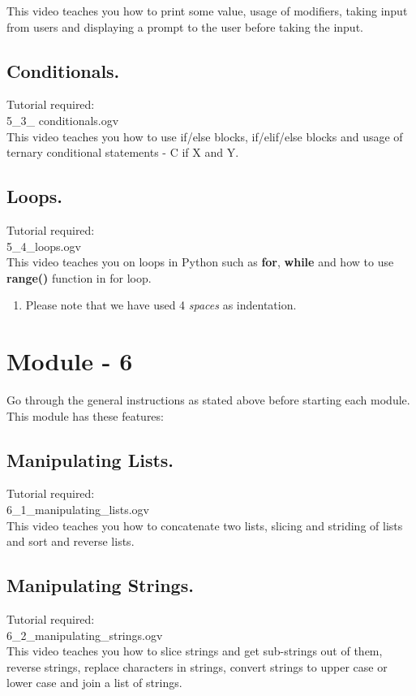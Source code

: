 \documentclass[11pt,twocolumn]{article}
\newenvironment{enumcpt}{\begin{enumerate} \topsep 0pt \partopsep 0pt 
                        \parsep 0pt
                        \itemsep 0pt \leftmargin -1in \rightmargin 0pt
                        }{\end{enumerate}}
\begin{document}
This video teaches you how to print some value, usage of modifiers, taking input from users and displaying a prompt to the user before taking the input. 
\subsection{Conditionals.}
Tutorial required: \\ 5\_3\_ conditionals.ogv \\
This video teaches you how to use if/else blocks, if/elif/else blocks and usage of ternary conditional statements - C if X and Y.
\subsection{Loops.}
Tutorial required: \\ 5\_4\_loops.ogv \\

This video teaches you on loops in Python such as \textbf{for}, \textbf{while} and how to use \textbf{range()} function in for loop. \\ 
\begin{enumcpt}
\item Please note that we have used 4 \emph{spaces} as indentation.
\end{enumcpt} 

\section{Module - 6}
Go through the general instructions as stated above before starting each module.
This module has these features:
\subsection{Manipulating Lists.}
Tutorial required: \\ 6\_1\_manipulating\_lists.ogv \\
 
This video teaches you how to concatenate two lists, slicing and striding of lists and sort and reverse lists.
\subsection{Manipulating Strings.}
Tutorial required: \\ 6\_2\_manipulating\_strings.ogv \\

This video teaches you how to slice strings and get sub-strings out of them, reverse strings, replace characters in strings, convert strings to upper case or lower case and join  a list of strings. 
\end{document}
